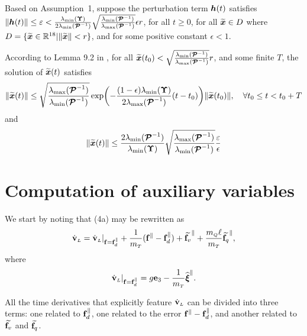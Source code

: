 \documentclass[journal,onecolumn]{IEEEtran}
\begin{document}
Based on Assumption~1, suppose the perturbation term $\boldsymbol{h}(t)$ satisfies $\|\boldsymbol{h}(t)\| \leq \varepsilon <\frac{\lambda_{\min}(\boldsymbol{\Upsilon})}{2\lambda_{\min}(\boldsymbol{\mathcal{P}}^{-1})}\sqrt{\frac{\lambda_{\min}(\boldsymbol{\mathcal{P}}^{-1})}{\lambda_{\max}(\boldsymbol{\mathcal{P}}^{-1})}}\epsilon r$, for all $t\geq0$, for all $\widetilde{\boldsymbol{x}}\in D$ where $D=\{ \widetilde{\boldsymbol{x}}\in\mathbb{R}^{18}| \|\widetilde{\boldsymbol{x}}\|<r \}$, and for some positive constant $\epsilon<1$.

According to Lemma 9.2 in \cite{2002_Khalil}, for all $\widetilde{\boldsymbol{x}}(t_0)<\sqrt{\frac{\lambda_{\min}(\boldsymbol{\mathcal{P}}^{-1})}{\lambda_{\max}(\boldsymbol{\mathcal{P}}^{-1})}}r$, and some finite $T$, the solution of $\widetilde{\boldsymbol{x}}(t)$ satisfies
%
\begin{equation}
	\|\widetilde{\boldsymbol{x}}(t)\|\leq \sqrt{\frac{\lambda_{\max}(\boldsymbol{\mathcal{P}}^{-1})}{\lambda_{\min}(\boldsymbol{\mathcal{P}}^{-1})}}\exp(-\frac{(1-\epsilon)\lambda_{\min}(\boldsymbol{\Upsilon})}{2\lambda_{\max}(\boldsymbol{\mathcal{P}}^{-1})}(t-t_0))\|\widetilde{\boldsymbol{x}}(t_0)\|, \quad\forall t_0\leq t<t_0+T
\end{equation}
%
and
%
\begin{equation}
	\|\widetilde{\boldsymbol{x}}(t)\|\leq \frac{2\lambda_{\min}(\boldsymbol{\mathcal{P}}^{-1})}{\lambda_{\min}(\boldsymbol{\Upsilon})} \sqrt{\frac{\lambda_{\max}(\boldsymbol{\mathcal{P}}^{-1})}{\lambda_{\min}(\boldsymbol{\mathcal{P}}^{-1})}}\frac{\varepsilon}{\epsilon}
\end{equation}


\section{Computation of auxiliary variables}
\label{sec:aux_notation}

	We start by noting that (4a) may be rewritten as
	\begin{equation}
		\vLdot = \vLdot|_{\f=\fd^{\|}} + \frac{1}{\mT}(\f^{\|}-\fd^{\|}) + \widetilde{\f_v}^{\|} + \frac{\mQ\ellp}{\mT}\widetilde{\f_q}^{\|},
		\label{eq:vL_dot_aux1}
	\end{equation}
	where
	\begin{equation}
		\vLdot|_{\f=\fd^{\|}} = g\ez - \frac{1}{\mT}\widehat{\Xiq}^{\|}.
	\end{equation}

	All the time derivatives that explicitly feature $\vLdot$ can be divided into three terms: one related to $\fd^{\|}$, one related to the error $\f^{\|}-\fd^{\|}$, and another related to $\widetilde{\f_v}$ and $\widetilde{\f_q}$.
\end{document}

